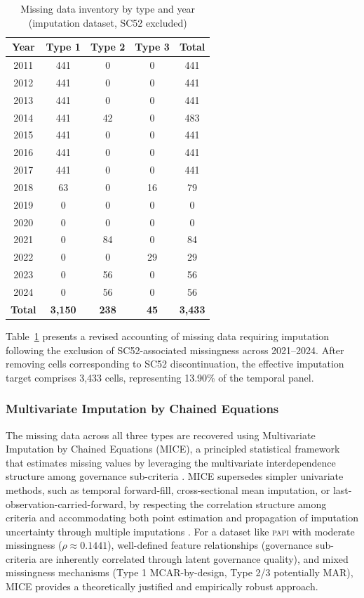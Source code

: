 \documentclass[12pt,a4paper]{article}
\newcommand{\PAPI}{\textsc{papi}\xspace}
\begin{document}
\begin{table}[!ht]
\centering
\caption{Missing data inventory by type and year (imputation dataset, SC52 excluded)}
\label{tab:missing_by_type_imputed}
\small
\begin{tabular}{c c c c c}
\toprule
\textbf{Year} & \textbf{Type 1} & \textbf{Type 2} & \textbf{Type 3} & \textbf{Total} \\
\midrule
2011 & 441 & 0 & 0 & 441 \\
2012 & 441 & 0 & 0 & 441 \\
2013 & 441 & 0 & 0 & 441 \\
2014 & 441 & 42 & 0 & 483 \\
2015 & 441 & 0 & 0 & 441 \\
2016 & 441 & 0 & 0 & 441 \\
2017 & 441 & 0 & 0 & 441 \\
2018 & 63 & 0 & 16 & 79 \\
2019 & 0 & 0 & 0 & 0 \\
2020 & 0 & 0 & 0 & 0 \\
2021 & 0 & 84 & 0 & 84 \\
2022 & 0 & 0 & 29 & 29 \\
2023 & 0 & 56 & 0 & 56 \\
2024 & 0 & 56 & 0 & 56 \\
\midrule
\textbf{Total} & \textbf{3,150} & \textbf{238} & \textbf{45} & \textbf{3,433} \\
\bottomrule
\end{tabular}
\end{table}

\FloatBarrier

Table~\ref{tab:missing_by_type_imputed} presents a revised accounting of missing data requiring imputation following the exclusion of SC52-associated missingness across 2021--2024. After removing cells corresponding to SC52 discontinuation, the effective imputation target comprises 3,433 cells, representing 13.90\% of the temporal panel.

\subsubsection{Multivariate Imputation by Chained Equations}

The missing data across all three types are recovered using Multivariate Imputation by Chained Equations (MICE), a principled statistical framework that estimates missing values by leveraging the multivariate interdependence structure among governance sub-criteria \citep{Rubin1987, vanBuuren2018}. MICE supersedes simpler univariate methods, such as temporal forward-fill, cross-sectional mean imputation, or last-observation-carried-forward, by respecting the correlation structure among criteria and accommodating both point estimation and propagation of imputation uncertainty through multiple imputations \citep{vanBuuren2018}. For a dataset like \PAPI with moderate missingness ($\rho \approx 0.1441$), well-defined feature relationships (governance sub-criteria are inherently correlated through latent governance quality), and mixed missingness mechanisms (Type 1 MCAR-by-design, Type 2/3 potentially MAR), MICE provides a theoretically justified and empirically robust approach.
\end{document}
